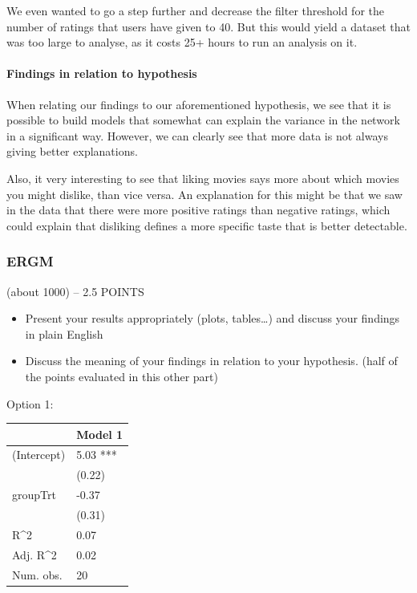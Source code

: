 \documentclass[
  english,
  man,floatsintext]{apa6}
\let\oldparagraph\paragraph
\renewcommand{\paragraph}[1]{\oldparagraph{#1}\mbox{}}
\begin{document}
We even wanted to go a step further and decrease the filter threshold for the number of ratings that users have given to 40. But this would yield a dataset that was too large to analyse, as it costs 25+ hours to run an analysis on it.

\hypertarget{findings-in-relation-to-hypothesis}{%
\paragraph{Findings in relation to hypothesis}\label{findings-in-relation-to-hypothesis}}

When relating our findings to our aforementioned hypothesis, we see that it is possible to build models that somewhat can explain the variance in the network in a significant way. However, we can clearly see that more data is not always giving better explanations.

Also, it very interesting to see that liking movies says more about which movies you might dislike, than vice versa. An explanation for this might be that we saw in the data that there were more positive ratings than negative ratings, which could explain that disliking defines a more specific taste that is better detectable.

\hypertarget{ergm-1}{%
\subsubsection{ERGM}\label{ergm-1}}

(about 1000) -- 2.5 POINTS

\begin{itemize}
\item
  Present your results appropriately (plots, tables\ldots) and discuss your findings
  in plain English
\item
  Discuss the meaning of your findings in relation to your hypothesis. (half of
  the points evaluated in this other part)
\end{itemize}

Option 1:

\begin{tabular}{l|l}
\hline
 & Model 1\\
\hline
(Intercept) & 5.03 ***\\
\hline
 & (0.22)\\
\hline
groupTrt & -0.37\\
\hline
 & (0.31)\\
\hline
R\textasciicircum{}2 & 0.07\\
\hline
Adj. R\textasciicircum{}2 & 0.02\\
\hline
Num. obs. & 20\\
\hline
\end{tabular}
\end{document}
